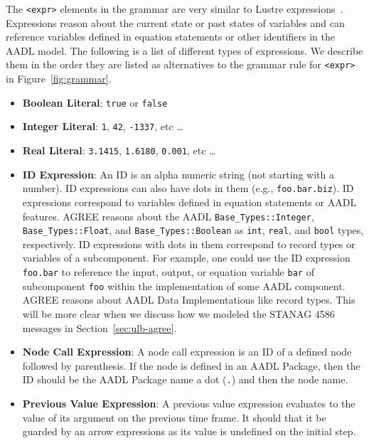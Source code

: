 \documentclass{llncs}
\begin{document}
The \texttt{<expr>} elements in the grammar are very similar to Lustre expressions~\cite{lustre}.  Expressions reason about the current state or past states of variables and can reference variables defined in equation statements or other identifiers in the AADL model. The following is a list of different types of expressions. We describe them in the order they are listed as alternatives to the grammar rule for \texttt{<expr>} in Figure~\ref{fig:grammar}.

\begin{itemize}
\item \textbf{Boolean Literal}: \texttt{true} or \texttt{false}

\item \textbf{Integer Literal}: \texttt{1}, \texttt{42}, \texttt{-1337}, etc \ldots

\item \textbf{Real Literal}: \texttt{3.1415}, \texttt{1.6180}, \texttt{0.001}, etc \ldots

\item \textbf{ID Expression}: An ID is an alpha numeric string (not starting with a number).  ID expressions can also have dots in them (e.g., \texttt{foo.bar.biz}).  ID expressions correspond to variables defined in equation statements or AADL features.  AGREE reasons about the AADL \texttt{Base\_Types::Integer}, \\\texttt{Base\_Types::Float}, and \texttt{Base\_Types::Boolean} as \texttt{int}, \texttt{real}, and \texttt{bool} types, respectively.  ID expressions with dots in them correspond to record types or variables of a subcomponent.  For example, one could use the ID expression \texttt{foo.bar} to reference the input, output, or equation variable \texttt{bar} of subcomponent \texttt{foo} within the implementation of some AADL component. AGREE reasons about AADL Data Implementations like record types.  This will be more clear when we discuss how we modeled the STANAG 4586 messages in Section~\ref{sec:ulb-agree}.

\item \textbf{Node Call Expression}: A node call expression is an ID of a defined node followed by parenthesis.  If the node is defined in an AADL Package, then the ID should be the AADL Package name a dot (\texttt{.}) and then the node name.

\item \textbf{Previous Value Expression}: A previous value expression evaluates to the value of its argument on the previous time frame.  It should that it be guarded by an arrow expressions as its value is undefined on the initial step.


\end{itemize}
\end{document}
